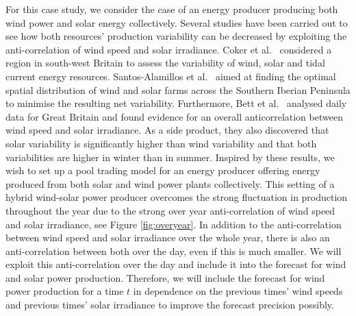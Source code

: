 For this case study, we consider the case of an energy producer producing both wind power and solar energy collectively. Several studies have been carried out to see how both resources' production variability  can be decreased by exploiting the anti-correlation of wind speed and solar irradiance. Coker et al.\ \cite{Coker2013} considered a region in south-west Britain to assess the variability of wind, solar and tidal current energy resources. Santos-Alamillos et al.\ \cite{Santos-Alamillos} aimed at finding the optimal spatial distribution of wind and solar farms across the Southern Iberian Peninsula to minimise the resulting net variability. Furthermore, Bett et al.\ \cite{BETT16} analysed daily data for Great Britain and found  evidence for an overall anticorrelation between wind speed and solar irradiance. As a side product, they also discovered that solar variability is significantly higher than wind variability and that both variabilities are higher in winter than in summer. Inspired by these results, we wish to set up a pool trading model for an energy producer offering energy produced from both solar and wind power plants collectively.  
This setting of a hybrid wind-solar power producer
	overcomes the strong fluctuation in production throughout the year due to the strong over year anti-correlation of wind speed and solar irradiance, see Figure \ref{fig:overyear}. In addition to
	the anti-correlation between wind speed and solar irradiance over the whole year, there is also an anti-correlation between both over the day, even if this is much smaller. We will exploit this anti-correlation over the day and include it into the forecast
	for wind and solar power production. Therefore, we will include the forecast for wind power production for a time $t$ in dependence on the previous times' wind speeds and previous times' solar irradiance to improve the forecast precision possibly.

